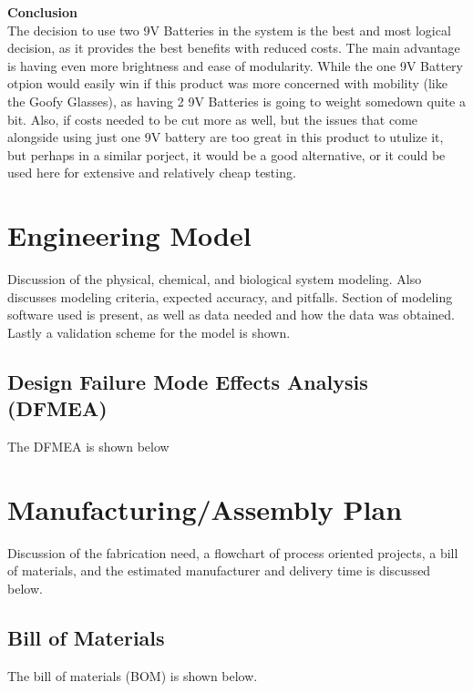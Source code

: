 \documentclass[12pt]{article}
\begin{document}
{{{{{{{		\noindent\textbf{Conclusion}\\
			\indent The decision to use two 9V Batteries in the system is the best and most logical decision, as it provides the best benefits with reduced costs. The main advantage is having even more brightness and ease of modularity. While the one 9V Battery otpion would easily win if this product was more concerned with mobility (like the Goofy Glasses), as having 2 9V Batteries is going to weight somedown quite a bit. Also, if costs needed to be cut more as well, but the issues that come alongside using just one 9V battery are too great in this product to utulize it, but perhaps in a similar porject, it would be a good alternative, or it could be used here for extensive and relatively cheap testing.

	\newpage

\section{Engineering Model}
	Discussion of the physical, chemical, and biological system modeling. Also discusses modeling criteria, expected accuracy, and pitfalls. Section of modeling software used is present, as well as data needed and how the data was obtained. Lastly a validation scheme for the model is shown.
	
	\subsection{Design Failure Mode Effects Analysis (DFMEA)}
	The DFMEA is shown below
	
	

	\newpage

\section{Manufacturing/Assembly Plan}
	Discussion of the fabrication need, a flowchart of process oriented projects, a bill of materials, and the estimated manufacturer and delivery time is discussed below.

	\subsection{Bill of Materials}
	The bill of materials (BOM) is shown below.
	
}}}}}}}
\end{document}
